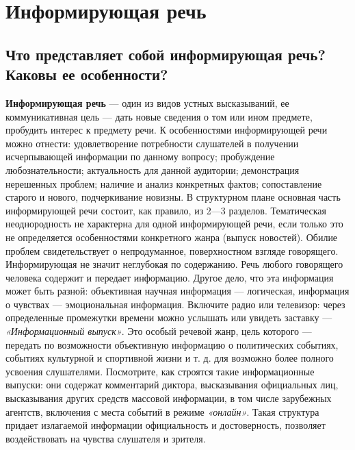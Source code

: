 \section{Информирующая речь}

\subsection*{Что представляет собой информирующая речь? Каковы ее особенности?}

\textbf{Информирующая речь} — один из видов устных высказываний, ее коммуникативная цель — дать новые сведения о том или
ином предмете, пробудить интерес к предмету речи. 
К особенностями информирующей речи можно отнести: удовлетворение потребности слушателей в получении исчерпывающей информации по данному вопросу; пробуждение любознательности; актуальность для данной аудитории; демонстрация нерешенных проблем; наличие и анализ конкретных фактов; сопоставление старого и нового, подчеркивание новизны. 
В структурном плане основная часть информирующей речи состоит, как правило, из 2—3 разделов. 
Тематическая неоднородность не характерна для одной информирующей речи, если только это не определяется особенностями конкретного жанра (выпуск новостей). Обилие проблем свидетельствует о непродуманное, поверхностном взгляде говорящего. Информирующая не значит неглубокая по содержанию. Речь любого говорящего человека содержит и передает информацию. Другое дело, что эта информация может быть разной: объективная научная информация — логическая, информация о чувствах — эмоциональная информация. Включите радио или телевизор: через определенные промежутки времени можно услышать или увидеть заставку — \textit{«Информационный выпуск»}. Это особый речевой жанр, цель которого — передать по возможности объективную информацию о политических событиях, событиях культурной и спортивной жизни и т. д. для возможно более полного усвоения слушателями. Посмотрите, как строятся такие информационные выпуски: они содержат комментарий диктора, высказывания официальных лиц, высказывания других средств массовой информации, в том числе зарубежных агентств, включения с места событий в режиме \textit{«онлайн»}. Такая структура придает излагаемой информации официальность и достоверность, позволяет воздействовать на чувства слушателя и зрителя.

